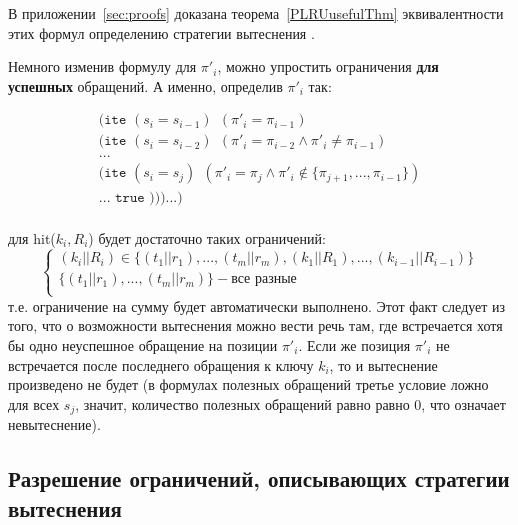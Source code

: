 \begin{enumerate}
В приложении~\ref{sec:proofs} доказана теорема~\ref{PLRUusefulThm} эквивалентности этих формул определению стратегии вытеснения \PseudoLRU.

Немного изменив формулу для $\pi'_i$, можно упростить ограничения \textbf{для}\\ \textbf{успешных} обращений. А именно, определив $\pi'_i$ так:

$$
\begin{array}{l}
\texttt{(ite~} (s_i = s_{i-1}) ~~ (\pi'_i = \pi_{i-1})\\
\texttt{(ite~} (s_i = s_{i-2}) ~~ (\pi'_i = \pi_{i-2} \wedge \pi'_i \neq \pi_{i-1})\\
...\\
\texttt{(ite~} (s_i = s_j) ~~ (\pi'_i = \pi_j \wedge \pi'_i \notin \{\pi_{j+1}, ..., \pi_{i-1}\})\\
... \texttt{~true )))...)}\\
\end{array}
$$

для hit($k_i, R_i$) будет достаточно таких ограничений:
$$
\left\{\begin{array}{l}
(k_i||R_i) \in \{(t_1||r_1), ..., (t_m||r_m), (k_1||R_1), ..., (k_{i-1}||R_{i-1})\}\\
\{(t_1||r_1), ..., (t_m||r_m)\} - \mbox{все разные}\\
\end{array} \right.
$$
т.е. ограничение на сумму будет автоматически выполнено. Этот факт следует из того, что о возможности вытеснения можно вести речь там, где встречается хотя бы одно неуспешное обращение на позиции $\pi'_i$. Если же позиция $\pi'_i$ не встречается после последнего обращения к ключу $k_i$, то и вытеснение произведено не будет (в формулах полезных обращений третье условие ложно для всех $s_j$, значит, количество полезных обращений равно равно 0, что означает невытеснение).

\subsection{Разрешение ограничений, описывающих стратегии вытеснения}


\end{enumerate}
